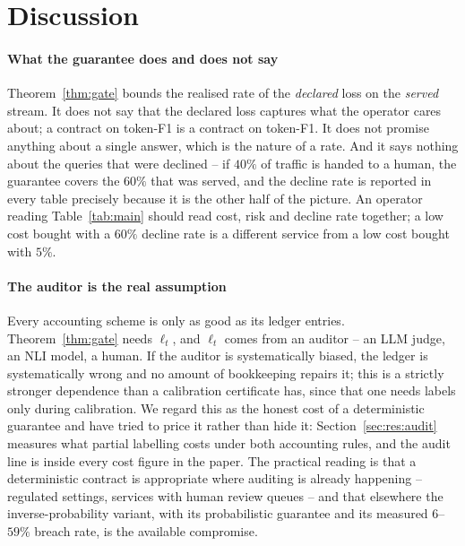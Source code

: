 \section{Discussion}
\label{sec:discussion}

\paragraph{What the guarantee does and does not say}
Theorem~\ref{thm:gate} bounds the realised rate of the \emph{declared}
loss on the \emph{served} stream. It does not say that the declared loss
captures what the operator cares about; a contract on token-F1 is a
contract on token-F1. It does not promise anything about a single
answer, which is the nature of a rate. And it says nothing about the
queries that were declined -- if $40\%$ of traffic is handed to a human,
the guarantee covers the $60\%$ that was served, and the decline rate is
reported in every table precisely because it is the other half of the
picture. An operator reading Table~\ref{tab:main} should read cost, risk
and decline rate together; a low cost bought with a $60\%$ decline rate
is a different service from a low cost bought with $5\%$.

\paragraph{The auditor is the real assumption}
Every accounting scheme is only as good as its ledger entries.
Theorem~\ref{thm:gate} needs $\ell_t$, and $\ell_t$ comes from an
auditor -- an LLM judge, an NLI model, a human. If the auditor is
systematically biased, the ledger is systematically wrong and no amount
of bookkeeping repairs it; this is a strictly stronger dependence than a
calibration certificate has, since that one needs labels only during
calibration. We regard this as the honest cost of a deterministic
guarantee and have tried to price it rather than hide it:
Section~\ref{sec:res:audit} measures what partial labelling costs under
both accounting rules, and the audit line is inside every cost figure in
the paper. The practical reading is that a deterministic contract is
appropriate where auditing is already happening -- regulated settings,
services with human review queues -- and that elsewhere the
inverse-probability variant, with its probabilistic guarantee and its
measured $6$--$59\%$ breach rate, is the available compromise.


